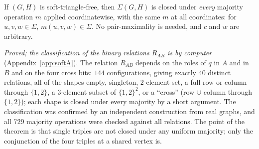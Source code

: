 \begin{theorem}\label{thm:sfA}
If $(G,H)$ is soft-triangle-free, then $\Sigma(G,H)$ is closed under \emph{every} majority operation $m$ applied coordinatewise, with the same $m$ at all coordinates: for $u,v,w\in\Sigma$, $m(u,v,w)\in\Sigma$. No pair-maximality is needed, and $c$ and $w$ are arbitrary.
\end{theorem}
\emph{Proved; the classification of the binary relations $R_{AB}$ is by computer} (Appendix~\ref{app:softA}). The relation $R_{AB}$ depends on the roles of $q$ in $A$ and in $B$ and on the four cross bits: $144$ configurations, giving exactly $40$ distinct relations, all of the shapes empty, singleton, $2$-element set, a full row or column through $\{1,2\}$, a $3$-element subset of $\{1,2\}^2$, or a ``cross'' (row $\cup$ column through $\{1,2\}$); each shape is closed under every majority by a short argument. The classification was confirmed by an independent construction from real graphs, and all $729$ majority operations were checked against all relations. The point of the theorem is that single triples are not closed under any uniform majority; only the conjunction of the four triples at a shared vertex is.

